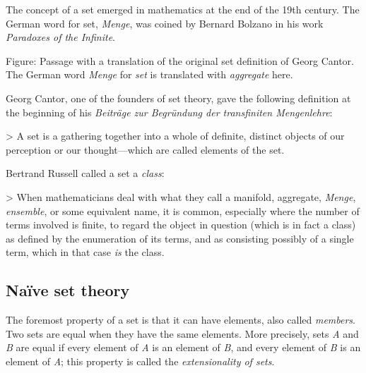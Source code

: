 The concept of a set emerged in mathematics at the end of the 19th century. The German
word for set, \textit{Menge}, was coined by Bernard Bolzano in his work \textit{Paradoxes
of the Infinite}.






Figure: Passage with a translation of the original set definition of Georg Cantor. The
German word \textit{Menge} for \textit{set} is translated with \textit{aggregate} here.



Georg Cantor, one of the founders of set theory, gave the following definition at the
beginning of his \textit{Beiträge zur Begründung der transfiniten Mengenlehre}:



> A set is a gathering together into a whole of definite, distinct objects of our
perception or our thought—which are called elements of the set.



Bertrand Russell called a set a \textit{class}:



> When mathematicians deal with what they call a manifold, aggregate, \textit{Menge},
\textit{ensemble}, or some equivalent name, it is common, especially where the number of
terms involved is finite, to regard the object in question (which is in fact a class) as
defined by the enumeration of its terms, and as consisting possibly of a single term,
which in that case \textit{is} the class.




\subsection{Naïve set theory}
\label{sss:nave-da1e}




The foremost property of a set is that it can have elements, also called \textit{members}.
Two sets are equal when they have the same elements. More precisely, sets \textit{A} and
\textit{B} are equal if every element of \textit{A} is an element of \textit{B}, and every
element of \textit{B} is an element of \textit{A}; this property is called the
\textit{extensionality of sets}.




